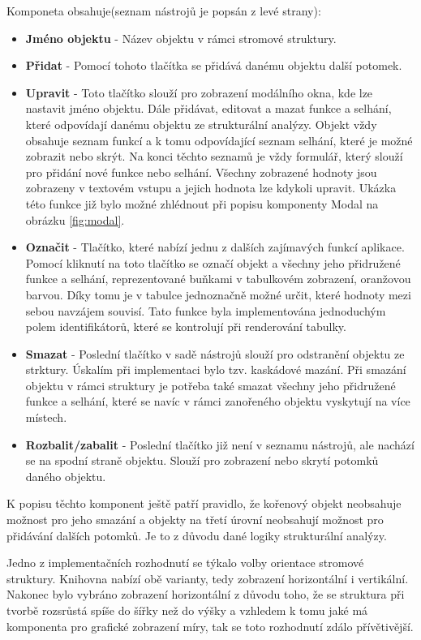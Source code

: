 Komponeta obsahuje(seznam nástrojů je popsán z levé strany): 
\begin{itemize}
    \item \textbf{Jméno objektu} - Název objektu v rámci stromové struktury. 
    \item \textbf{Přidat} - Pomocí tohoto tlačítka se přidává danému objektu další potomek. 
    \item \textbf{Upravit} - Toto tlačítko slouží pro zobrazení modálního okna, kde lze nastavit jméno objektu. Dále přidávat, editovat a mazat funkce a selhání, které odpovídají danému objektu ze strukturální analýzy. Objekt vždy obsahuje seznam funkcí a k tomu odpovídající seznam selhání, které je možné zobrazit nebo skrýt. Na konci těchto seznamů je vždy formulář, který slouží pro přidání nové funkce nebo selhání. Všechny zobrazené hodnoty jsou zobrazeny v textovém vstupu a jejich hodnota lze kdykoli upravit. Ukázka této funkce již bylo možné zhlédnout při popisu komponenty Modal na obrázku \ref{fig:modal}.
    \item \textbf{Označit} - Tlačítko, které nabízí jednu z dalších zajímavých funkcí aplikace. Pomocí kliknutí na toto tlačítko se označí objekt a všechny jeho přidružené funkce a selhání, reprezentované buňkami v tabulkovém zobrazení, oranžovou barvou. Díky tomu je v tabulce jednoznačně možné určit, které hodnoty mezi sebou navzájem souvisí. Tato funkce byla implementována jednoduchým polem identifikátorů, které se kontrolují při renderování tabulky. 
    \item \textbf{Smazat} - Poslední tlačítko v sadě nástrojů slouží pro odstranění objektu ze strktury. Úskalím při implementaci bylo tzv. kaskádové mazání. Při smazání objektu v rámci struktury je potřeba také smazat všechny jeho přidružené funkce a selhání, které se navíc v rámci zanořeného objektu vyskytují na více místech. 
    \item \textbf{Rozbalit/zabalit} - Poslední tlačítko již není v seznamu nástrojů, ale nachází se na spodní straně objektu. Slouží pro zobrazení nebo skrytí potomků daného objektu. 
\end{itemize}

K popisu těchto komponent ještě patří pravidlo, že kořenový objekt neobsahuje možnost pro jeho smazání a objekty na třetí úrovní neobsahují možnost pro přidávání dalších potomků. Je to z důvodu dané logiky strukturální analýzy. 

Jedno z implementačních rozhodnutí se týkalo volby orientace stromové struktury. Knihovna nabízí obě varianty, tedy zobrazení horizontální i vertikální. Nakonec bylo vybráno zobrazení horizontální z důvodu toho, že se struktura při tvorbě rozsrůstá spíše do šířky než do výšky a vzhledem k tomu jaké má komponenta pro grafické zobrazení míry, tak se toto rozhodnutí zdálo přívětivější. 


